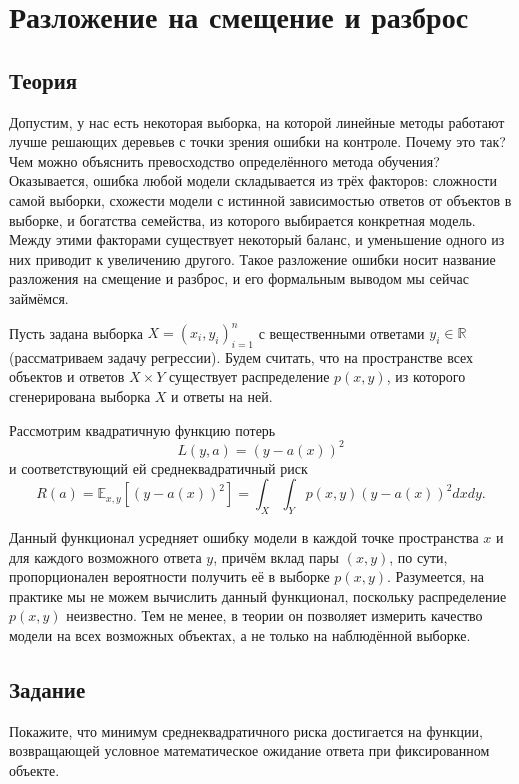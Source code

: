 \section*{Разложение на смещение и разброс}


\subsection*{Теория}

Допустим, у нас есть некоторая выборка, на которой линейные методы работают лучше решающих деревьев с точки зрения ошибки на контроле. Почему это так? Чем можно объяснить превосходство определённого метода обучения? Оказывается, ошибка любой модели складывается из трёх факторов: сложности самой выборки, схожести модели с истинной зависимостью ответов от объектов в выборке, и богатства семейства, из которого выбирается конкретная модель. Между этими факторами существует некоторый баланс, и уменьшение одного из них приводит к увеличению другого. Такое разложение ошибки носит название разложения на смещение и разброс, и его формальным выводом мы сейчас займёмся.

\vspace*{0.4cm}

Пусть задана выборка $X = (x_i, y_i)_{i=1}^n$ с вещественными ответами $y_i \in \mathbb{R}$ (рассматриваем задачу регрессии). Будем считать, что на пространстве всех объектов и ответов $X \times Y$ существует распределение $p(x, y)$, из которого сгенерирована выборка $X$ и ответы на ней.

Рассмотрим квадратичную функцию потерь
\[
L(y, a) = (y - a(x))^2
\]
и соответствующий ей среднеквадратичный риск
\[
R(a) = \mathbb{E}_{x, y} \left[ (y - a(x))^2 \right] = \int_{X} \int_{Y} p(x, y) (y - a(x))^2 dxdy.
\]

Данный функционал усредняет ошибку модели в каждой точке пространства $x$ и для каждого возможного ответа $y$, причём вклад пары $(x, y)$, по сути, пропорционален вероятности получить её в выборке $p(x, y)$. Разумеется, на практике мы не можем вычислить данный функционал, поскольку распределение $p(x, y)$ неизвестно. Тем не менее, в теории он позволяет измерить качество модели на всех возможных объектах, а не только на наблюдённой выборке.

\subsection*{Задание}

Покажите, что минимум среднеквадратичного риска достигается на функции, возвращающей условное математическое ожидание ответа при фиксированном объекте.

